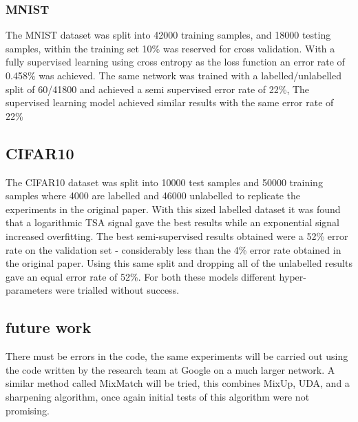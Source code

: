\documentclass[a4paper]{article}
\begin{document}
\subsubsection{MNIST}
The MNIST dataset was split into 42000 training samples, and 18000 testing samples, within the training set 10\% was reserved for cross validation. With a fully supervised learning using cross entropy as the loss function an error rate of 0.458\% was achieved. The same network was trained with a labelled/unlabelled split of 60/41800 and achieved a semi supervised error rate of 22\%, The supervised learning model achieved similar results with the same error rate of 22\%

\subsection{CIFAR10}
The CIFAR10 dataset was split into 10000 test samples and 50000 training samples where 4000 are labelled and 46000 unlabelled to replicate the experiments in the original paper. 
With this sized labelled dataset it was found that a logarithmic TSA signal gave the best results while an exponential signal increased overfitting. The best semi-supervised results obtained were a 52\% error rate on the validation set - considerably less than the 4\% error rate obtained in the original paper. Using this same split and dropping all of the unlabelled results gave an equal error rate of 52\%. For both these models different hyper-parameters were trialled without success.

\subsection{future work}
There must be errors in the code, the same experiments will be carried out using the code written by the research team at Google on a much larger network. A similar method called MixMatch will be tried, this combines MixUp, UDA, and a sharpening algorithm, once again initial tests of this algorithm were not promising. 
\end{document}
